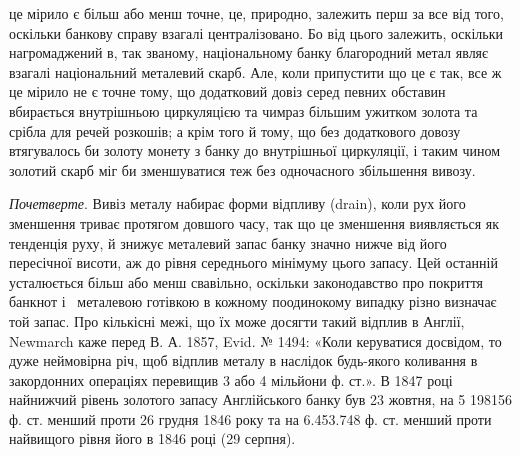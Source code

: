 \parcont{}  %
це мірило є більш або менш точне, це, природно, залежить перш за все від
того, оскільки банкову справу взагалі централізовано. Бо від цього залежить,
оскільки нагромаджений в, так званому, національному банку благородний метал
являє взагалі національний металевий скарб. Але, коли припустити що це є так,
все ж це мірило не є точне тому, що додатковий довіз серед певних обставин
вбирається внутрішньою циркуляцією та чимраз більшим ужитком золота та
срібла для речей розкошів; а крім того й тому, що без додаткового довозу
втягувалось би золоту монету з банку до внутрішньої циркуляції, і таким
чином золотий скарб міг би зменшуватися теж без одночасного збільшення вивозу.

\emph{Почетверте}. Вивіз металу набирає форми відпливу (drain), коли рух
його зменшення триває протягом довшого часу, так що це зменшення виявляється
як тенденція руху, й знижує металевий запас банку значно нижче від його пересічної
висоти, аж до рівня середнього мінімуму цього запасу. Цей останній усталюється
більш або менш свавільно, оскільки законодавство про покриття банкнот і~
металевою готівкою в кожному поодинокому випадку різно визначає той запас.
Про кількісні межі, що їх може досягти такий відплив в Англії, Newmarch
каже перед В. А. 1857, Evid. № 1494: «Коли керуватися досвідом, то дуже
неймовірна річ, щоб відплив металу в наслідок будь-якого коливання в закордонних
операціях перевищив 3 або 4 мільйони ф. ст.». В 1847 році найнижчий
рівень золотого запасу Англійського банку був 23 жовтня, на 5 198156 ф. ст.
менший проти 26 грудня 1846 року та на 6.453.748 ф. ст. менший проти найвищого
рівня його в 1846 році (29 серпня).

